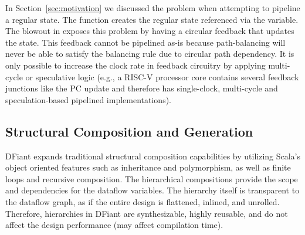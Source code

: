 In Section~\ref{sec:motivation} we discussed the problem when attempting to pipeline a regular state. The  function creates the regular state referenced via the  variable. The  blowout in  exposes this problem by having a circular feedback that updates the  state. This feedback cannot be pipelined as-is because path-balancing will never be able to satisfy the balancing rule due to circular path dependency. It is only possible to increase the clock rate in feedback circuitry by applying multi-cycle or speculative logic (e.g., a RISC-V processor core contains several feedback junctions like the PC update and therefore has single-clock, multi-cycle and speculation-based pipelined implementations). 


\subsection{Structural Composition and Generation}
DFiant expands traditional structural composition capabilities by utilizing Scala's object oriented features such as inheritance and polymorphism, as well as finite loops and recursive composition. The hierarchical compositions provide the scope and dependencies for the dataflow variables. The hierarchy itself is transparent to the dataflow graph, as if the entire design is flattened, inlined, and unrolled. Therefore, hierarchies in DFiant are synthesizable, highly reusable, and do not affect the design performance (may affect compilation time). 


